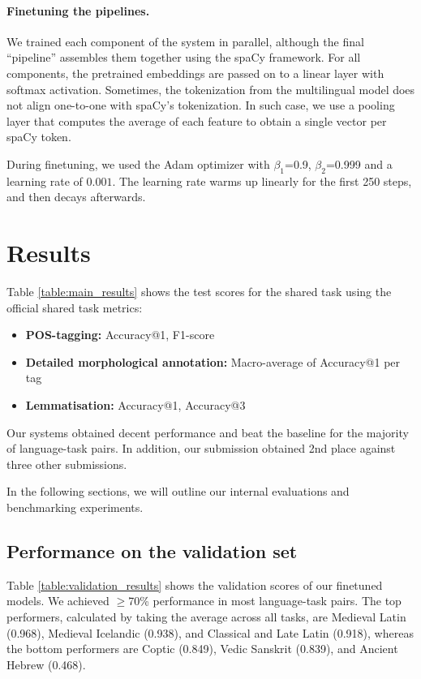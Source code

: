 \documentclass[11pt]{article}
\begin{document}
\paragraph{Finetuning the pipelines.} We trained each component of the system in parallel, although the final ``pipeline'' assembles them together using the spaCy framework.
For all components, the pretrained embeddings are passed on to a linear layer with softmax activation.
Sometimes, the tokenization from the multilingual model does not align one-to-one with spaCy's tokenization.
In such case, we use a pooling layer that computes the average of each feature to obtain a single vector per spaCy token.

During finetuning, we used the Adam optimizer with $\beta_1$=0.9, $\beta_2$=0.999 and a learning rate of $0.001$.
The learning rate warms up linearly for the first 250 steps, and then decays afterwards.

\section{Results}

Table \ref{table:main_results} shows the test scores for the shared task using the official shared task metrics:

\begin{itemize}
  \item \textbf{POS-tagging:}	Accuracy@1, F1-score
  \item \textbf{Detailed morphological annotation:} Macro-average of Accuracy@1 per tag
  \item \textbf{Lemmatisation:} Accuracy@1, Accuracy@3
\end{itemize}

Our systems obtained decent performance and beat the baseline for the majority of language-task pairs.
In addition, our submission obtained 2nd place against three other submissions.

In the following sections, we will outline our internal evaluations and benchmarking experiments.

\subsection{Performance on the validation set}



Table \ref{table:validation_results} shows the validation scores of our finetuned models.
We achieved $\geq$70\% performance in most language-task pairs.
The top performers, calculated by taking the average across all tasks, are Medieval Latin (0.968), Medieval Icelandic (0.938), and Classical and Late Latin (0.918),
whereas the bottom performers are Coptic (0.849), Vedic Sanskrit (0.839), and Ancient Hebrew (0.468).
\end{document}
